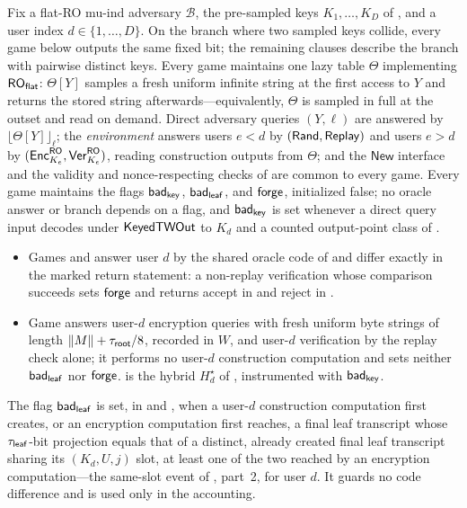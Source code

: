 \begin{definition}
\label{def:adjacent-hybrid-games}
Fix a flat-RO mu-ind adversary $\mathcal{B}$, the pre-sampled keys
$K_1, \dots, K_D$ of , and a user index
$d \in \{1, \dots, D\}$. On the branch where two sampled keys collide,
every game below outputs the same fixed bit; the remaining clauses
describe the branch with pairwise distinct keys. Every game maintains
one lazy table $\Theta$ implementing $\mathsf{RO}_{\mathsf{flat}}$: $\Theta[Y]$ samples a
fresh uniform infinite string at the first access to $Y$ and returns
the stored string afterwards---equivalently, $\Theta$ is sampled in
full at the outset and read on demand. Direct adversary queries
$(Y, \ell)$ are answered by $\lfloor \Theta[Y] \rfloor_\ell$; the
\emph{environment} answers users $e < d$ by $(\mathsf{Rand}, \mathsf{Replay})$ and
users $e > d$ by $(\mathsf{Enc}_{K_e}^{\mathsf{RO}}, \mathsf{Ver}_{K_e}^{\mathsf{RO}})$, reading
construction outputs from $\Theta$; and the $\mathsf{New}$ interface
and the validity and nonce-respecting checks of 
are common to every game. Every game maintains the flags $\mathsf{bad}_{\mathsf{key}}$,
$\mathsf{bad}_{\mathsf{leaf}}$, and $\mathsf{forge}$, initialized false; no oracle answer or branch
depends on a flag, and $\mathsf{bad}_{\mathsf{key}}$ is set whenever a direct query input
decodes under $\mathsf{KeyedTWOut}$ to $K_d$ and a counted output-point class
of .
\begin{itemize}
\item Games \Greal{} and \Grej{} answer user $d$ by the shared oracle
  code of  and differ exactly in the
  marked return statement: a non-replay verification whose comparison
  succeeds sets $\mathsf{forge}$ and returns accept in \Greal{} and reject in
  \Grej{}.
\item Game \Gideal{} answers user-$d$ encryption queries with fresh
  uniform byte strings of length $\|M\| + \tau_{\mathsf{root}}/8$, recorded in
  $W$, and user-$d$ verification by the replay check alone; it performs
  no user-$d$ construction computation and sets neither $\mathsf{bad}_{\mathsf{leaf}}$ nor
  $\mathsf{forge}$. \Gideal{} is the hybrid $H_d^\star$ of
  , instrumented with $\mathsf{bad}_{\mathsf{key}}$.
\end{itemize}
The flag $\mathsf{bad}_{\mathsf{leaf}}$ is set, in \Greal{} and \Grej{}, when a user-$d$
construction computation first creates, or an encryption computation
first reaches, a final leaf transcript whose
$\tau_{\mathsf{leaf}}$-bit projection equals that of a distinct, already created
final leaf transcript sharing its $(K_d, U, j)$ slot, at least one of
the two reached by an encryption computation---the same-slot event of
, part~2, for user $d$. It guards no code
difference and is used only in the accounting.
\end{definition}

